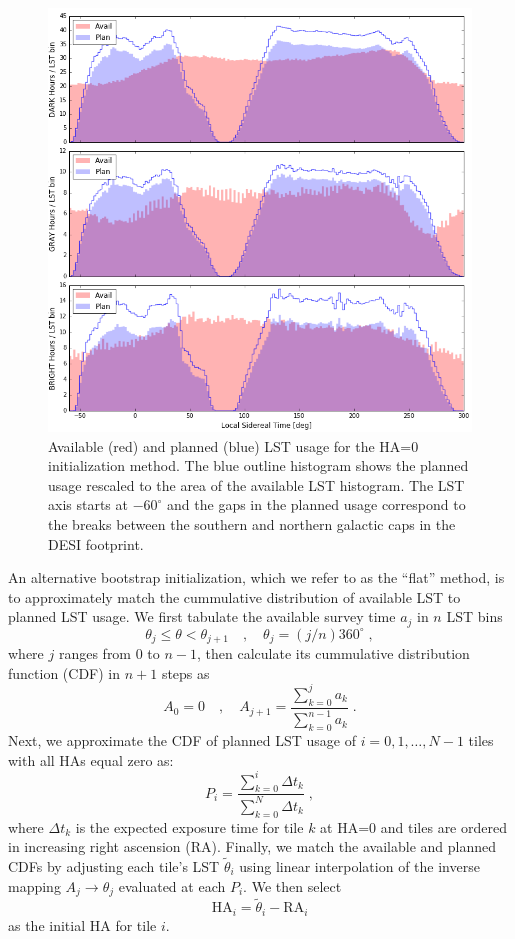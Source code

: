 \documentclass[12pt]{article}
\begin{document}
\begin{figure}[htb]
\begin{center}
\includegraphics[width=6in]{LST_zero0}
\caption{Available (red) and planned (blue) LST usage for the HA=0 initialization method.  The blue outline histogram shows the planned usage rescaled to the area of the available LST histogram.  The LST axis starts at $-60^\circ$ and the gaps in the planned usage correspond to the breaks between the southern and northern galactic caps in the DESI footprint.}
\label{fig:LST_zero0}
\end{center}
\end{figure}

An alternative bootstrap initialization, which we refer to as the ``flat'' method, is to approximately match the cummulative distribution of available LST to planned LST usage. We first tabulate the available survey time $a_j$ in $n$ LST bins
$$
\theta_j \le \theta < \theta_{j+1} \quad , \quad \theta_j = (j/n) 360^\circ \; ,
$$
where $j$ ranges from $0$ to $n-1$, then calculate its cummulative distribution function (CDF) in $n+1$ steps as
$$
A_0 = 0 \quad , \quad
A_{j+1} = \frac{\sum_{k=0}^{j} a_k}{\sum_{k=0}^{n-1} a_k} \; .
$$
Next, we approximate the CDF of planned LST usage of $i = 0, 1, \ldots, N-1$ tiles with all HAs equal zero as:
$$
P_i = \frac{\sum_{k=0}^{i} \Delta t_k}{\sum_{k=0}^N \Delta t_k} \; ,
$$
where $\Delta t_k$ is the expected exposure time for tile $k$ at HA=0 and tiles are ordered in increasing right ascension (RA). Finally, we match the available and planned CDFs by adjusting each tile's LST $\tilde{\theta}_i$ using linear interpolation of the inverse mapping $A_j \rightarrow \theta_j$ evaluated at each $P_i$.  We then select
$$
\text{HA}_i = \tilde{\theta}_i - \text{RA}_i
$$
as the initial HA for tile $i$.
\end{document}
